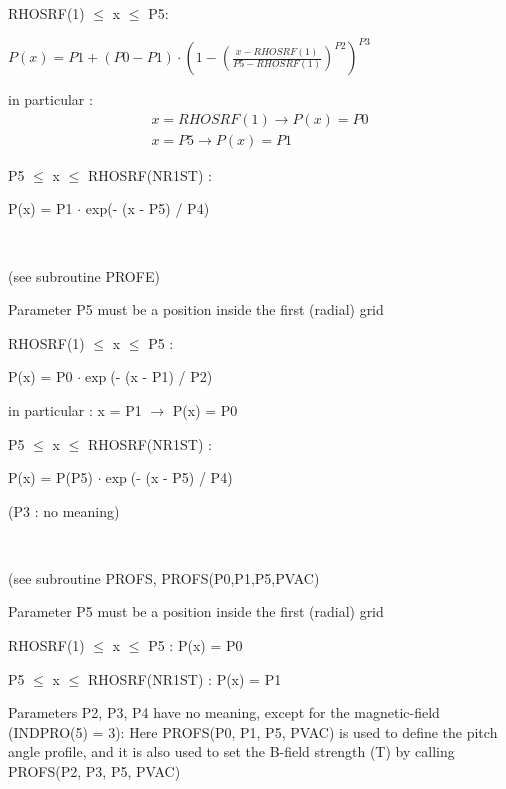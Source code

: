 \begin{description}
\begin{description}
                RHOSRF(1) $\le$ x $\le$ P5:

                $P(x) = P1+( P0 - P1 ) \cdot {\left ( 1 - {\left ( \frac{x - RHOSRF(1)}{P5 - RHOSRF(1)} \right )}^{P2} \right )}^{P3}$

                \medskip

                in particular :
                \[
                  \begin{array}{l}
                    x = RHOSRF(1)   \rightarrow  P(x) = P0 \\
                    x = P5	    \rightarrow  P(x) = P1
                  \end{array}
                \]

                \medskip

                P5 $\le$ x $\le$ RHOSRF(NR1ST) :

                P(x) = P1  $\cdot$ exp(- (x - P5) / P4)
          \item[INDPRO = 2] ~

                (see subroutine PROFE)

                Parameter P5 must be a position inside the first (radial) grid

                RHOSRF(1) $\le$ x $\le$ P5 :

                P(x) = P0  $\cdot \exp$(- (x - P1) / P2)

                in particular : x = P1 $\rightarrow$ P(x) = P0

                P5 $\le$ x $\le$ RHOSRF(NR1ST) :

                P(x) = P(P5)  $\cdot \exp$(- (x - P5) / P4)

                (P3 : no meaning)
          \item[INDPRO = 3] ~

                (see subroutine PROFS, PROFS(P0,P1,P5,PVAC)

                Parameter P5 must be a position inside the first (radial) grid

                RHOSRF(1) $\le$ x $\le$ P5 :	   P(x) = P0

                P5 $\le$ x $\le$ RHOSRF(NR1ST) :    P(x) = P1

                Parameters P2, P3, P4 have no meaning, except for the magnetic-field (INDPRO(5)
                = 3): Here PROFS(P0, P1, P5, PVAC) is used to define the pitch angle profile,
                and it is also used to set the B-field strength (\si{\tesla}) by calling
                PROFS(P2, P3, P5, PVAC)


\end{description}
\end{description}

